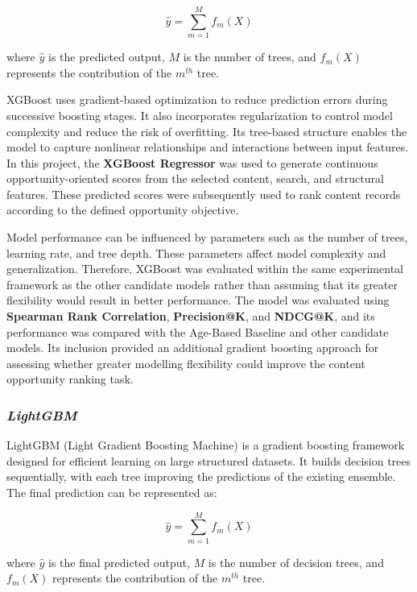 \documentclass[12pt,a4paper]{report}
\begin{document}
\begin{equation}
\hat{y} =
\sum_{m=1}^{M}
f_m(X)
\end{equation}

where $\hat{y}$ is the predicted output, $M$ is the number of trees, and $f_m(X)$ represents the contribution of the $m^{th}$ tree.

XGBoost uses gradient-based optimization to reduce prediction errors during successive boosting stages. It also incorporates regularization to control model complexity and reduce the risk of overfitting. Its tree-based structure enables the model to capture nonlinear relationships and interactions between input features. In this project, the \textbf{XGBoost Regressor} was used to generate continuous opportunity-oriented scores from the selected content, search, and structural features. These predicted scores were subsequently used to rank content records according to the defined opportunity objective.

Model performance can be influenced by parameters such as the number of trees, learning rate, and tree depth. These parameters affect model complexity and generalization. Therefore, XGBoost was evaluated within the same experimental framework as the other candidate models rather than assuming that its greater flexibility would result in better performance. The model was evaluated using \textbf{Spearman Rank Correlation}, \textbf{Precision@K}, and \textbf{NDCG@K}, and its performance was compared with the Age-Based Baseline and other candidate models. Its inclusion provided an additional gradient boosting approach for assessing whether greater modelling flexibility could improve the content opportunity ranking task.


\subsubsection{\textit{LightGBM}}
LightGBM (Light Gradient Boosting Machine) is a gradient boosting framework designed for efficient learning on large structured datasets. It builds decision trees sequentially, with each tree improving the predictions of the existing ensemble. The final prediction can be represented as:

\begin{equation}
\hat{y} =
\sum_{m=1}^{M}
f_m(X)
\end{equation}

where $\hat{y}$ is the final predicted output, $M$ is the number of decision trees, and $f_m(X)$ represents the contribution of the $m^{th}$ tree.
\end{document}
